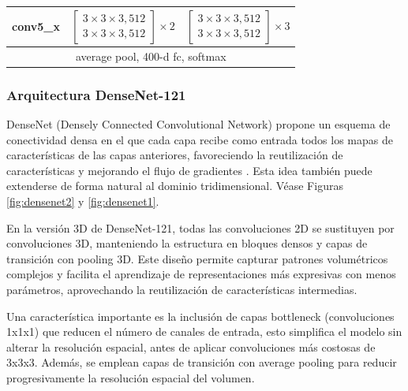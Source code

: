 \begin{table}[!htbp]
\begin{tabular}{ccc}
\hline
conv5\_x & $\left[\begin{array}{c}
         3 \times 3 \times 3, 512 \\
         3 \times 3 \times 3, 512
         \end{array}\right] \times 2$ &
         $\left[\begin{array}{c}
         3 \times 3 \times 3, 512 \\
         3 \times 3 \times 3, 512
         \end{array}\right] \times 3$ \\
\hline
\multicolumn{3}{c}{average pool, 400-d fc, softmax} \\
\hline
\end{tabular}
\end{table}




\subsubsection{Arquitectura DenseNet-121}

DenseNet (Densely Connected Convolutional Network) propone un esquema de conectividad densa en el que cada capa recibe como entrada todos los mapas de características de las capas anteriores, favoreciendo la reutilización de características y mejorando el flujo de gradientes \parencite{huang2017densely}. Esta idea también puede extenderse de forma natural al dominio tridimensional. Véase Figuras \ref{fig:densenet2} y \ref{fig:densenet1}.

En la versión 3D de DenseNet-121, todas las convoluciones 2D se sustituyen por convoluciones 3D, manteniendo la estructura en bloques densos y capas de transición con pooling 3D. Este diseño permite capturar patrones volumétricos complejos y facilita el aprendizaje de representaciones más expresivas con menos parámetros, aprovechando la reutilización de características intermedias.  

Una característica importante es la inclusión de capas bottleneck (convoluciones 1x1x1) que reducen el número de canales de entrada, esto simplifica el modelo sin alterar la resolución espacial, antes de aplicar convoluciones más costosas de 3x3x3. Además, se emplean capas de transición con average pooling para reducir progresivamente la resolución espacial del volumen.

